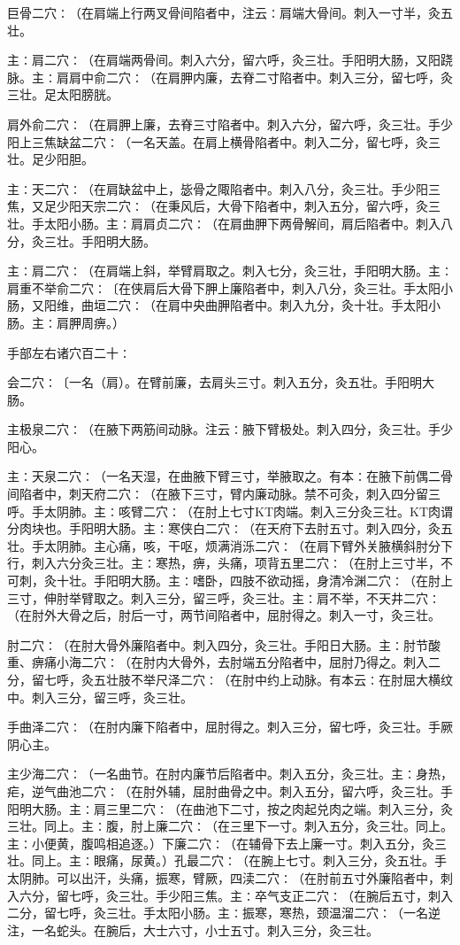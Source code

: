 \documentclass[a4paper,12pt,UTF8,twoside]{ctexbook}
\begin{document}
巨骨二穴∶（在肩端上行两叉骨间陷者中，注云∶肩端大骨间。刺入一寸半，灸五壮。

主∶肩二穴∶（在肩端两骨间。刺入六分，留六呼，灸三壮。手阳明大肠，又阳跷脉。主∶肩肩中俞二穴∶（在肩胛内廉，去脊二寸陷者中。刺入三分，留七呼，灸三壮。足太阳膀胱。

肩外俞二穴∶（在肩胛上廉，去脊三寸陷者中。刺入六分，留六呼，灸三壮。手少阳上三焦缺盆二穴∶（一名天盖。在肩上横骨陷者中。刺入二分，留七呼，灸三壮。足少阳胆。

主∶天二穴∶（在肩缺盆中上，毖骨之陬陷者中。刺入八分，灸三壮。手少阳三焦，又足少阳天宗二穴∶（在秉风后，大骨下陷者中，刺入五分，留六呼，灸三壮。手太阳小肠。主∶肩肩贞二穴∶（在肩曲胛下两骨解间，肩后陷者中。刺入八分，灸三壮。手阳明大肠。

主∶肩二穴∶（在肩端上斜，举臂肩取之。刺入七分，灸三壮，手阳明大肠。主∶肩重不举俞二穴∶〔在侠肩后大骨下胛上廉陷者中，刺入八分，灸三壮。手太阳小肠，又阳维，曲垣二穴∶（在肩中央曲胛陷者中。刺入九分，灸十壮。手太阳小肠。主∶肩胛周痹。）

手部左右诸穴百二十∶

会二穴∶〔一名（肩）。在臂前廉，去肩头三寸。刺入五分，灸五壮。手阳明大肠。

主极泉二穴∶（在腋下两筋间动脉。注云∶腋下臂极处。刺入四分，灸三壮。手少阳心。

主∶天泉二穴∶（一名天湿，在曲腋下臂三寸，举腋取之。有本∶在腋下前偶二骨间陷者中，刺天府二穴∶（在腋下三寸，臂内廉动脉。禁不可灸，刺入四分留三呼。手太阴肺。主∶咳臂二穴∶（在肘上七寸KT肉端。刺入三分灸三壮。KT肉谓分肉块也。手阳明大肠。主∶寒侠白二穴∶（在天府下去肘五寸。刺入四分，灸五壮。手太阴肺。主心痛，咳，干呕，烦满消泺二穴∶（在肩下臂外关腋横斜肘分下行，刺入六分灸三壮。主∶寒热，痹，头痛，项背五里二穴∶（在肘上三寸半，不可刺，灸十壮。手阳明大肠。主∶嗜卧，四肢不欲动摇，身清冷渊二穴∶（在肘上三寸，伸肘举臂取之。刺入三分，留三呼，灸三壮。主∶肩不举，不天井二穴∶（在肘外大骨之后，肘后一寸，两节间陷者中，屈肘得之。刺入一寸，灸三壮。

肘二穴∶（在肘大骨外廉陷者中。刺入四分，灸三壮。手阳日大肠。主∶肘节酸重、痹痛小海二穴∶（在肘内大骨外，去肘端五分陷者中，屈肘乃得之。刺入二分，留七呼，灸五壮肢不举尺泽二穴∶（在肘中约上动脉。有本云∶在肘屈大横纹中。刺入三分，留三呼，灸三壮。

手曲泽二穴∶（在肘内廉下陷者中，屈肘得之。刺入三分，留七呼，灸三壮。手厥阴心主。

主少海二穴∶（一名曲节。在肘内廉节后陷者中。刺入五分，灸三壮。主∶身热，疟，逆气曲池二穴∶（在肘外辅，屈肘曲骨之中。刺入五分，留六呼，灸三壮。手阳明大肠。主∶肩三里二穴∶（在曲池下二寸，按之肉起兑肉之端。刺入三分，灸三壮。同上。主∶腹，肘上廉二穴∶（在三里下一寸。刺入五分，灸三壮。同上。主∶小便黄，腹鸣相追逐。）下廉二穴∶（在辅骨下去上廉一寸。刺入五分，灸三壮。同上。主∶眼痛，尿黄。）孔最二穴∶（在腕上七寸。刺入三分，灸五壮。手太阴肺。可以出汗，头痛，振寒，臂厥，四渎二穴∶（在肘前五寸外廉陷者中，刺入六分，留七呼，灸三壮。手少阳三焦。主∶卒气支正二穴∶（在腕后五寸，刺入二分，留七呼，灸三壮。手太阳小肠。主∶振寒，寒热，颈温溜二穴∶（一名逆注，一名蛇头。在腕后，大士六寸，小士五寸。刺入三分，灸三壮。
\end{document}
